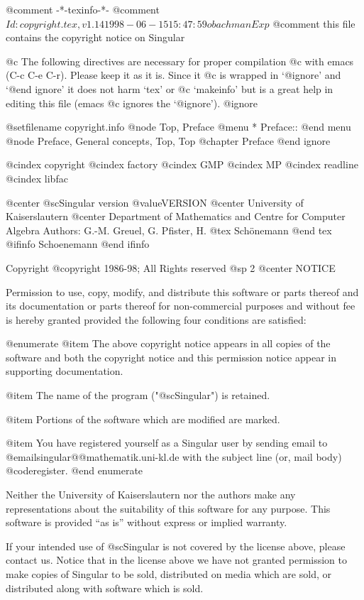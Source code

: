 @comment -*-texinfo-*-
@comment $Id: copyright.tex,v 1.14 1998-06-15 15:47:59 obachman Exp $
@comment this file contains the copyright notice on Singular

@c The following directives are necessary for proper compilation
@c with emacs (C-c C-e C-r).  Please keep it as it is.  Since it
@c is wrapped in `@ignore' and `@end ignore' it does not harm `tex' or
@c `makeinfo' but is a great help in editing this file (emacs
@c ignores the `@ignore').
@ignore

@setfilename copyright.info
@node Top, Preface
@menu
* Preface::
@end menu
@node Preface, General concepts, Top, Top
@chapter Preface
@end ignore

@cindex copyright
@cindex factory
@cindex GMP
@cindex MP
@cindex readline
@cindex libfac

@center @sc{Singular} version @value{VERSION}
@center University of Kaiserslautern
@center Department of Mathematics and Centre for Computer Algebra
Authors: G.-M. Greuel, G. Pfister, H.
@tex
Sch\"onemann
@end tex
@ifinfo
Schoenemann
@end ifinfo

Copyright @copyright{} 1986-98; All Rights reserved
@sp 2
                                @center NOTICE

Permission to use, copy, modify, and distribute this software or parts
thereof and its documentation or parts thereof for non-commercial
purposes and without fee is hereby granted provided the following four
conditions are satisfied:

@enumerate
@item
The above copyright notice appears in all copies of the software
and both the copyright notice and this permission notice
appear in supporting documentation.

@item
The name of the program ("@sc{Singular}") is retained.

@item
Portions of the software which are modified are marked.

@item 
You have registered yourself as a Singular user by sending email to
@email{singular@@mathematik.uni-kl.de} with the subject line (or, mail body)
@code{register}. 
@end enumerate

Neither the University of Kaiserslautern nor the authors make any
representations about the suitability of this software for any
purpose.  This software is provided ``as is'' without express or
implied warranty.

If your intended use of @sc{Singular} is not covered by the license above,
please contact us.  Notice that in the license above we have not
granted permission to make copies of Singular to be sold, distributed
on media which are sold, or distributed along with software which is
sold. 

